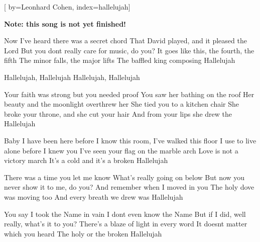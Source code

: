 
[%
    by={Leonhard Cohen},
    index={hallelujah}]


    \label{hallelujah}

    \textbf{Note: this song is not yet finished!}

    \beginverse
        Now I've heard there was a secret chord
        That David played, and it pleased the Lord
        But you dont really care for music, do you?
        It goes like this, the fourth, the fifth
        The minor falls, the major lifts
        The baffled king composing Hallelujah
    \endverse

    \beginchorus
        Hallelujah, Hallelujah
        Hallelujah, Hallelujah
    \endchorus

    \beginverse
        Your faith was strong but you needed proof
        You saw her bathing on the roof
        Her beauty and the moonlight overthrew her
        She tied you to a kitchen chair
        She broke your throne, and she cut your hair
        And from your lips she drew the Hallelujah
    \endverse


    \beginverse
        Baby I have been here before
        I know this room, I've walked this floor
        I use to live alone before I knew you
        I've seen your flag on the marble arch
        Love is not a victory march
        It's a cold and it's a broken Hallelujah
    \endverse


    \beginverse
        There was a time you let me know
        What's really going on below
        But now you never show it to me, do you?
        And remember when I moved in you
        The holy dove was moving too
        And every breath we drew was Hallelujah
    \endverse


    \beginverse
        You say I took the Name in vain
        I dont even know the Name
        But if I did, well really, what's it to you?
        There's a blaze of light in every word
        It doesnt matter which you heard
        The holy or the broken Hallelujah
    \endverse

\endsong
